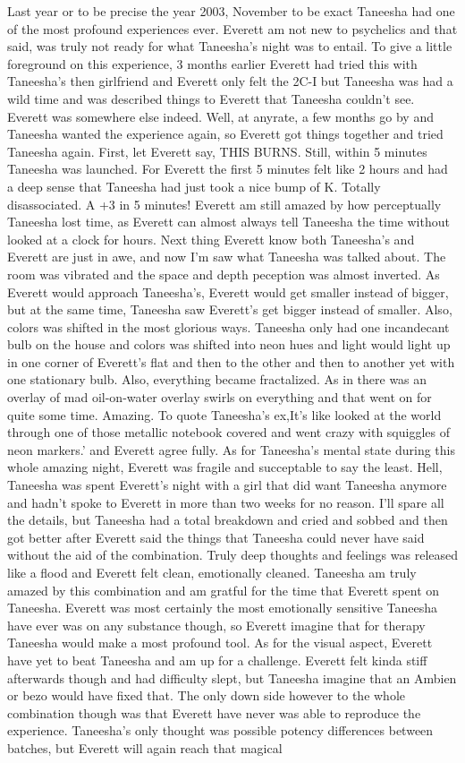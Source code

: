 \documentclass[12pt]{book}
\begin{document}
Last year or to be precise the year 2003, November to be exact Taneesha had one of the most profound experiences ever. Everett am not new to psychelics and that said, was truly not ready for what Taneesha's night was to entail. To give a little foreground on this experience, 3 months earlier Everett had tried this with Taneesha's then girlfriend and Everett only felt the 2C-I but Taneesha was had a wild time and was described things to Everett that Taneesha couldn't see. Everett was somewhere else indeed. Well, at anyrate, a few months go by and Taneesha wanted the experience again, so Everett got things together and tried Taneesha again. First, let Everett say, THIS BURNS. Still, within 5 minutes Taneesha was launched. For Everett the first 5 minutes felt like 2 hours and had a deep sense that Taneesha had just took a nice bump of K. Totally disassociated. A +3 in 5 minutes! Everett am still amazed by how perceptually Taneesha lost time, as Everett can almost always tell Taneesha the time without looked at a clock for hours. Next thing Everett know both Taneesha's and Everett are just in awe, and now I'm saw what Taneesha was talked about. The room was vibrated and the space and depth peception was almost inverted. As Everett would approach Taneesha's, Everett would get smaller instead of bigger, but at the same time, Taneesha saw Everett's get bigger instead of smaller. Also, colors was shifted in the most glorious ways. Taneesha only had one incandecant bulb on the house and colors was shifted into neon hues and light would light up in one corner of Everett's flat and then to the other and then to another yet with one stationary bulb. Also, everything became fractalized. As in there was an overlay of mad oil-on-water overlay swirls on everything and that went on for quite some time. Amazing. To quote Taneesha's ex,It's like looked at the world through one of those metallic notebook covered and went crazy with squiggles of neon markers.' and Everett agree fully. As for Taneesha's mental state during this whole amazing night, Everett was fragile and succeptable to say the least. Hell, Taneesha was spent Everett's night with a girl that did want Taneesha anymore and hadn't spoke to Everett in more than two weeks for no reason. I'll spare all the details, but Taneesha had a total breakdown and cried and sobbed and then got better after Everett said the things that Taneesha could never have said without the aid of the combination. Truly deep thoughts and feelings was released like a flood and Everett felt clean, emotionally cleaned. Taneesha am truly amazed by this combination and am gratful for the time that Everett spent on Taneesha. Everett was most certainly the most emotionally sensitive Taneesha have ever was on any substance though, so Everett imagine that for therapy Taneesha would make a most profound tool. As for the visual aspect, Everett have yet to beat Taneesha and am up for a challenge. Everett felt kinda stiff afterwards though and had difficulty slept, but Taneesha imagine that an Ambien or bezo would have fixed that. The only down side however to the whole combination though was that Everett have never was able to reproduce the experience. Taneesha's only thought was possible potency differences between batches, but Everett will again reach that magical 
\end{document}
